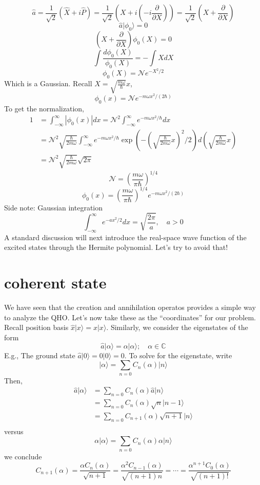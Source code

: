 \[ \hat{a}=\frac{1}{\sqrt{2}}\left( \hat{X}+i\hat{P} \right) =\frac{1}{\sqrt{2}}\left( X+i\left( -i\frac{\partial}{\partial X} \right) \right) =\frac{1}{\sqrt{2}}\left( X+\frac{\partial}{\partial X} \right) \]
\[ \hat{a}|\phi _0\rangle =0 \]
\[ \left( X+\frac{\partial}{\partial X} \right) \phi _0\left( X \right) =0 \]
\[ \int{\frac{d\phi _0\left( X \right)}{\phi _0\left( X \right)}}=-\int{XdX}\]
\[ \phi _0\left( X \right) =\mathcal{N} e^{-X^2/2}\]
Which is a Gaussian. Recall $X=\sqrt{\frac{m\omega}{\hbar}}x$,
\[ \phi _0\left( x \right) =\mathcal{N} e^{-m\omega x^2/\left( 2\hbar \right)} \]
To get the normalization,
\begin{align*}
    1&=\int_{-\infty}^{\infty}{\left| \phi _0\left( x \right) \right|}dx=\mathcal{N} ^2\int_{-\infty}^{\infty}{e^{-m\omega x^2/\hbar}dx}\\
    &=\mathcal{N} ^2\sqrt{\frac{\hbar}{2m\omega}}\int_{-\infty}^{\infty}{e^{-m\omega x^2/\hbar}\exp \left( -\left( \sqrt{\frac{\hbar}{2m\omega}}x \right) ^2/2 \right) d\left( \sqrt{\frac{\hbar}{2m\omega}}x \right)}\\
    &=\mathcal{N} ^2\sqrt{\frac{\hbar}{2m\omega}}\sqrt{2\pi}
\end{align*}
\[ \mathcal{N} =\left( \frac{m\omega}{\pi \hbar} \right) ^{1/4} \]
\[ \phi _0\left( x \right) =\left( \frac{m\omega}{\pi \hbar} \right) ^{1/4}e^{-m\omega x^2/\left( 2\hbar \right)} \]
Side note: Gaussian integration
\[ \int_{-\infty}^{\infty}{e^{-ax^2/2}dx}=\sqrt{\frac{2\pi}{a}},\quad a>0 \]
A standard discussion will next introduce the real-space wave function of the excited states through the Hermite polynomial. Let's try to avoid that!

\section{coherent state}

We have seen that the creation and annihilation operatos provides a simple way to analyze the QHO. Let's now take these as the ``coordinates'' for our problem. Recall position basis $\hat{x}|x\rangle =x|x\rangle$. Similarly, we consider the eigenstates of the form
\[ \hat{a}|\alpha \rangle =\alpha |\alpha \rangle ;\quad \alpha \in \mathbb{C} \]
E.g., The ground state $\hat{a}|0\rangle =0|0\rangle =0$. To solve for the eigenstate, write
\[ |\alpha \rangle =\sum_{n=0}{C_n\left( \alpha \right) |n\rangle}\]
Then,
\begin{align*}
    \hat{a}|\alpha \rangle &=\sum_{n=0}{C_n\left( \alpha \right) \hat{a}|n\rangle}\\
    &=\sum_{n=0}{C_n\left( \alpha \right) \sqrt{n}|n-1\rangle}\\
    &=\sum_{n=0}{C_{n+1}\left( \alpha \right) \sqrt{n+1}|n\rangle}\\
\end{align*}
versus
\[ \alpha |\alpha \rangle =\sum_{n=0}{C_n\left( \alpha \right) \alpha |n\rangle}\]
we conclude
\[ C_{n+1}\left( \alpha \right) =\frac{\alpha C_n\left( \alpha \right)}{\sqrt{n+1}}=\frac{\alpha ^2C_{n-1}\left( \alpha \right)}{\sqrt{\left( n+1 \right) n}}=\cdots =\frac{\alpha ^{n+1}C_0\left( \alpha \right)}{\sqrt{\left( n+1 \right) !}} \]

